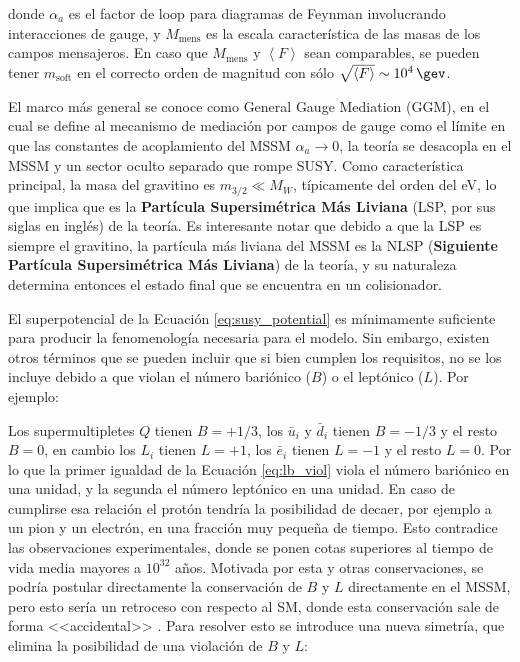 donde $\alpha_a$ es el factor de loop para diagramas de Feynman involucrando interacciones de gauge, y $M_\text{mens}$ es la escala característica de las masas de los campos mensajeros. En
caso que $M_\text{mens}$ y $\left< F \right>$ sean comparables, se pueden tener $m_{\text{soft}}$ en el correcto
orden de magnitud con sólo $\sqrt{\left< F \right>}\sim 10^4\,\gev$.

El marco más general se conoce como General Gauge Mediation (GGM), en el
cual se define al mecanismo de mediación por campos de gauge como el límite en
que las constantes de acoplamiento del MSSM $\alpha_a\to 0$, la teoría se desacopla en el
MSSM y un sector oculto separado que rompe SUSY. Como característica principal, la masa del
gravitino es $m_{3/2} \ll M_W$, típicamente del orden del eV, lo que implica que es la \textbf{Partícula Supersimétrica Más Liviana} (LSP, por sus siglas en inglés) 
de la teoría. Es interesante notar que debido a que la LSP es siempre el gravitino, la
partícula más liviana del MSSM es la NLSP (\textbf{Siguiente Partícula Supersimétrica Más Liviana}) de la teoría, y su naturaleza determina
entonces el estado final que se encuentra en un colisionador.



El superpotencial de la Ecuación \ref{eq:susy_potential} es mínimamente suficiente para producir la fenomenología necesaria para el modelo. Sin embargo, existen otros términos que se pueden incluir que si bien cumplen los requisitos, no se los incluye debido a que violan el número bariónico ($B$) o el leptónico ($L$). Por ejemplo:



Los supermultipletes $Q$ tienen $B=+1/3$, los $\bar{u}_i$ y $\bar{d}_i$ tienen $B=-1/3$ y el resto $B=0$, en cambio los $L_i$ tienen $L=+1$, los $\bar{e}_i$ tienen $L=-1$ y el resto $L=0$. Por lo que la primer igualdad de la Ecuación \ref{eq:lb_viol} viola el número bariónico en una unidad, y la segunda el número leptónico en una unidad. En caso de cumplirse esa relación el protón tendría la posibilidad de decaer, por ejemplo a un pion y un electrón, en una fracción muy pequeña de tiempo. Esto contradice las observaciones experimentales, donde se ponen cotas superiores al tiempo de vida media mayores a $10^{32}$ años. Motivada por esta y otras conservaciones, se podría postular directamente la conservación de $B$ y $L$ directamente en el MSSM, pero esto sería un retroceso con respecto al SM, donde esta conservación sale de forma 
<<accidental>>
. Para resolver esto se introduce una nueva simetría, que elimina la posibilidad de una violación de $B$ y $L$:


